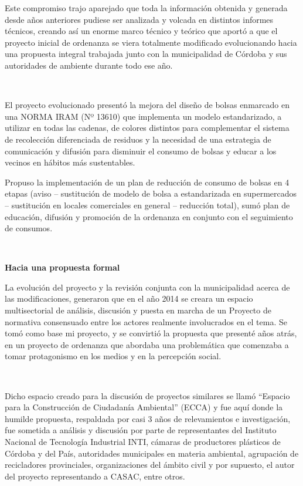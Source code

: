 \begin{fullwidth}
Este compromiso trajo aparejado que toda la información obtenida y
generada desde años anteriores pudiese ser analizada y volcada en
distintos informes técnicos, creando así un enorme marco técnico y
teórico que aportó a que el proyecto inicial de ordenanza se viera
totalmente modificado evolucionando hacia una propuesta integral
trabajada junto con la municipalidad de Córdoba y sus autoridades de
ambiente durante todo ese año.

~

El proyecto evolucionado presentó la mejora del diseño de bolsas
enmarcado en una NORMA IRAM (Nº 13610) que implementa un modelo
estandarizado, a utilizar en todas las cadenas, de colores distintos
para complementar el sistema de recolección diferenciada de residuos y
la necesidad de una estrategia de comunicación y difusión para disminuir
el consumo de bolsas y educar a los vecinos en hábitos más sustentables.

Propuso la implementación de un plan de reducción de consumo de bolsas
en 4 etapas (aviso -- sustitución de modelo de bolsa a estandarizada en
supermercados -- sustitución en locales comerciales en general --
reducción total), sumó plan de educación, difusión y promoción de la
ordenanza en conjunto con el seguimiento de consumos.

~

\textbf{Hacia una propuesta formal}

La evolución del proyecto y la revisión conjunta con la municipalidad
acerca de las modificaciones, generaron que en el año 2014 se creara un
espacio multisectorial de análisis, discusión y puesta en marcha de un
Proyecto de normativa consensuado entre los actores realmente
involucrados en el tema. Se tomó como base mi proyecto, y se convirtió
la propuesta que presenté años atrás, en un proyecto de ordenanza que
abordaba una problemática que comenzaba a tomar protagonismo en los
medios y en la percepción social.

~

Dicho espacio creado para la discusión de proyectos similares se llamó
``Espacio para la Construcción de Ciudadanía Ambiental'' (ECCA) y fue
aquí donde la humilde propuesta, respaldada por casi 3 años de
relevamientos e investigación, fue sometida a análisis y discusión por
parte de representantes del Instituto Nacional de Tecnología Industrial
INTI, cámaras de productores plásticos de Córdoba y del País,
autoridades municipales en materia ambiental, agrupación de recicladores
provinciales, organizaciones del ámbito civil y por supuesto, el autor
del proyecto representando a CASAC, entre otros.


\end{fullwidth}
